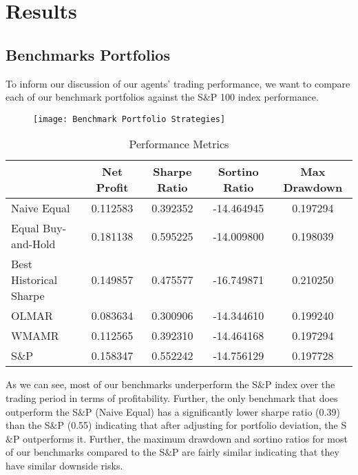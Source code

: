 \chapter{Results}

\section{Benchmarks Portfolios}
To inform our discussion of our agents' trading performance, we want to compare each of our benchmark portfolios against the S$\&$P 100 index performance.

\begin{center}
\begin{figure}
\texttt{[image: Benchmark Portfolio Strategies]}
\end{figure}
\end{center}

\begin{table}[htbp]
    \centering
    \caption{Performance Metrics}
      \begin{tabular}{lcccc}
      \toprule
            & Net Profit & Sharpe Ratio & Sortino Ratio & Max Drawdown \\
      \midrule
      Naive Equal & 0.112583 & 0.392352 & -14.464945 & 0.197294 \\
      Equal Buy-and-Hold & 0.181138 & 0.595225 & -14.009800 & 0.198039 \\
      Best Historical Sharpe & 0.149857 & 0.475577 & -16.749871 & 0.210250 \\
      OLMAR & 0.083634 & 0.300906 & -14.344610 & 0.199240 \\
      WMAMR & 0.112565 & 0.392310 & -14.464168 & 0.197294 \\
      S\&P & 0.158347 & 0.552242 & -14.756129 & 0.197728 \\
      \bottomrule
      \end{tabular}%
    \label{tab:addlabel}%
  \end{table}%

As we can see, most of our benchmarks underperform the S$\&$P index over the trading period in terms of profitability. 
Further, the only benchmark that does outperform the S$\&$P (Naive Equal) has a significantly lower sharpe ratio (0.39) than the S$\&$P (0.55) indicating that after adjusting for portfolio deviation, the S$\&$P outperforms it.
Further, the maximum drawdown and sortino ratios for most of our benchmarks compared to the S$\&$P are fairly similar indicating that they have similar downside risks.

